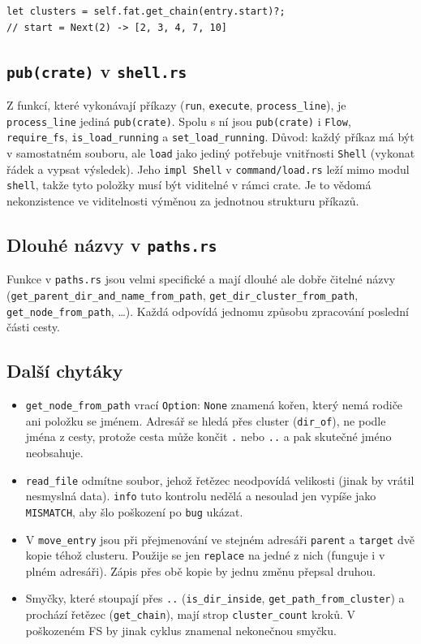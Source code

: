 \documentclass[10pt, a4paper]{report}
\newcommand{\code}[1]{\texttt{#1}}
\begin{document}
	\begin{lstlisting}
let clusters = self.fat.get_chain(entry.start)?;   
// start = Next(2) -> [2, 3, 4, 7, 10]
	\end{lstlisting}
	
	\subsection{\code{pub(crate)} v \code{shell.rs}}
	\label{sec:pubcrate}
	
	Z funkcí, které vykonávají příkazy (\code{run}, \code{execute}, \code{process\_line}), je
	\code{process\_line} jediná \code{pub(crate)}. Spolu s ní jsou \code{pub(crate)} i \code{Flow},
	\code{require\_fs}, \code{is\_load\_running} a \code{set\_load\_running}. Důvod: každý příkaz
	má být v samostatném souboru, ale \code{load} jako jediný potřebuje vnitřnosti \code{Shell}
	(vykonat řádek a vypsat výsledek). Jeho \code{impl Shell} v \code{command/load.rs} leží mimo
	modul \code{shell}, takže tyto položky musí být viditelné v rámci crate. Je to vědomá
	nekonzistence ve viditelnosti výměnou za jednotnou strukturu příkazů.
	
	\subsection{Dlouhé názvy v \code{paths.rs}}
	
	Funkce v \code{paths.rs} jsou velmi specifické a mají dlouhé ale dobře čitelné názvy
	(\code{get\_parent\_dir\_and\_name\_from\_path}, \code{get\_dir\_cluster\_from\_path},
	\code{get\_node\_from\_path}, \dots). Každá odpovídá jednomu způsobu zpracování poslední části
	cesty.
	
	\subsection{Další chytáky}
	
	\begin{itemize}
		\item \code{get\_node\_from\_path} vrací \code{Option}: \code{None} znamená kořen, který
		nemá rodiče ani položku se jménem. Adresář se hledá přes cluster (\code{dir\_of}), ne podle
		jména z cesty, protože cesta může končit \code{.} nebo \code{..} a pak skutečné jméno
		neobsahuje.
		\item \code{read\_file} odmítne soubor, jehož řetězec neodpovídá velikosti (jinak by vrátil
		nesmyslná data). \code{info} tuto kontrolu nedělá a nesoulad jen vypíše jako
		\code{MISMATCH}, aby šlo poškození po \code{bug} ukázat.
		\item V \code{move\_entry} jsou při přejmenování ve stejném adresáři \code{parent} a
		\code{target} dvě kopie téhož clusteru. Použije se jen \code{replace} na jedné z nich
		(funguje i v plném adresáři). Zápis přes obě kopie by jednu změnu přepsal druhou.
		\item Smyčky, které stoupají přes \code{..} (\code{is\_dir\_inside},
		\code{get\_path\_from\_cluster}) a prochází řetězec (\code{get\_chain}), mají strop
		\code{cluster\_count} kroků. V poškozeném FS by jinak cyklus znamenal nekonečnou smyčku.
	\end{itemize}
	
\end{document}
